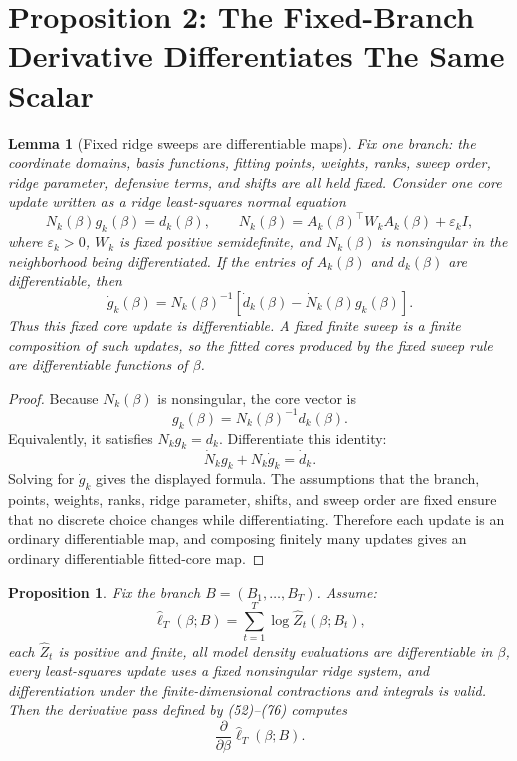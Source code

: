 \documentclass[11pt]{article}
\newtheorem{proposition}{Proposition}
\newtheorem{lemma}{Lemma}
\newcommand{\widehatell}{\widehat\ell}
\begin{document}
\section{Proposition 2: The Fixed-Branch Derivative Differentiates The Same Scalar}

\begin{lemma}[Fixed ridge sweeps are differentiable maps]
Fix one branch: the coordinate domains, basis functions, fitting points,
weights, ranks, sweep order, ridge parameter, defensive terms, and shifts are
all held fixed.  Consider one core update written as a ridge least-squares
normal equation
\[
    N_k(\beta)g_k(\beta)=d_k(\beta),
    \qquad
    N_k(\beta)=A_k(\beta)^\top W_k A_k(\beta)+\varepsilon_k I,
\]
where \(\varepsilon_k>0\), \(W_k\) is fixed positive semidefinite, and
\(N_k(\beta)\) is nonsingular in the neighborhood being differentiated.  If the
entries of \(A_k(\beta)\) and \(d_k(\beta)\) are differentiable, then
\[
    \dot g_k(\beta)
    =
    N_k(\beta)^{-1}
    \left[
    \dot d_k(\beta)-\dot N_k(\beta)g_k(\beta)
    \right].
\]
Thus this fixed core update is differentiable.  A fixed finite sweep is a
finite composition of such updates, so the fitted cores produced by the fixed
sweep rule are differentiable functions of \(\beta\).
\end{lemma}

\begin{proof}
Because \(N_k(\beta)\) is nonsingular, the core vector is
\[
    g_k(\beta)=N_k(\beta)^{-1}d_k(\beta).
\]
Equivalently, it satisfies \(N_k g_k=d_k\).  Differentiate this identity:
\[
    \dot N_k g_k+N_k\dot g_k=\dot d_k.
\]
Solving for \(\dot g_k\) gives the displayed formula.  The assumptions that the
branch, points, weights, ranks, ridge parameter, shifts, and sweep order are
fixed ensure that no discrete choice changes while differentiating.  Therefore
each update is an ordinary differentiable map, and composing finitely many
updates gives an ordinary differentiable fitted-core map.
\end{proof}

\begin{proposition}
Fix the branch \(B=(B_1,\ldots,B_T)\).  Assume:
\[
    \widehatell_T(\beta;B)=\sum_{t=1}^T\log\widehat Z_t(\beta;B_t),
    \tag{P19-85}
\]
each \(\widehat Z_t\) is positive and finite, all model density evaluations are
differentiable in \(\beta\), every least-squares update uses a fixed
nonsingular ridge system, and differentiation under the finite-dimensional
contractions and integrals is valid.  Then the derivative pass defined by
(52)--(76) computes
\[
    \frac{\partial}{\partial\beta}
    \widehatell_T(\beta;B).
    \tag{P19-86}
\]
\end{proposition}
\end{document}
